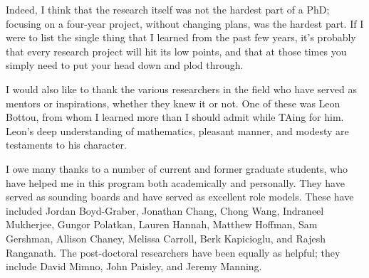 Indeed, I think that the research itself was not the hardest part of a
PhD; focusing on a four-year project, without changing plans, was the
hardest part. If I were to list the single thing that I learned from
the past few years, it's probably that every research project will hit
its low points, and that at those times you simply need to put your
head down and plod through.

I would also like to thank the various researchers in the field who
have served as mentors or inspirations, whether they knew it or not.
One of these was Leon Bottou, from whom I learned more than I should
admit while TAing for him. Leon's deep understanding of mathematics,
pleasant manner, and modesty are testaments to his character.

I owe many thanks to a number of current and former graduate students,
who have helped me in this program both academically and personally.
They have served as sounding boards and have served as excellent role
models.  These have included Jordan Boyd-Graber, Jonathan Chang, Chong
Wang, Indraneel Mukherjee, Gungor Polatkan, Lauren Hannah, Matthew
Hoffman, Sam Gershman, Allison Chaney, Melissa Carroll, Berk
Kapicioglu, and Rajesh Ranganath.  The post-doctoral researchers have
been equally as helpful; they include David Mimno, John Paisley, and
Jeremy Manning.



